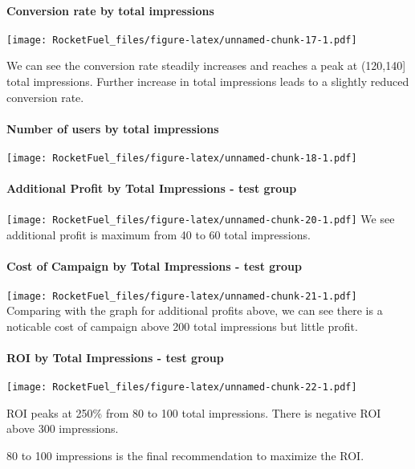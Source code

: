 \documentclass[
]{article}
\begin{document}
\hypertarget{conversion-rate-by-total-impressions-3}{%
\paragraph{Conversion rate by total
impressions}\label{conversion-rate-by-total-impressions-3}}

\texttt{[image: RocketFuel\_files/figure-latex/unnamed-chunk-17-1.pdf]}

We can see the conversion rate steadily increases and reaches a peak at
(120,140{]} total impressions. Further increase in total impressions
leads to a slightly reduced conversion rate.

\hypertarget{number-of-users-by-total-impressions-2}{%
\paragraph{Number of users by total
impressions}\label{number-of-users-by-total-impressions-2}}

\texttt{[image: RocketFuel\_files/figure-latex/unnamed-chunk-18-1.pdf]}

\hypertarget{additional-profit-by-total-impressions---test-group-1}{%
\paragraph{Additional Profit by Total Impressions - test
group}\label{additional-profit-by-total-impressions---test-group-1}}

\texttt{[image: RocketFuel\_files/figure-latex/unnamed-chunk-20-1.pdf]}
We see additional profit is maximum from 40 to 60 total impressions.

\hypertarget{cost-of-campaign-by-total-impressions---test-group-1}{%
\paragraph{Cost of Campaign by Total Impressions - test
group}\label{cost-of-campaign-by-total-impressions---test-group-1}}

\texttt{[image: RocketFuel\_files/figure-latex/unnamed-chunk-21-1.pdf]}
Comparing with the graph for additional profits above, we can see there
is a noticable cost of campaign above 200 total impressions but little
profit.

\hypertarget{roi-by-total-impressions---test-group-1}{%
\paragraph{ROI by Total Impressions - test
group}\label{roi-by-total-impressions---test-group-1}}

\texttt{[image: RocketFuel\_files/figure-latex/unnamed-chunk-22-1.pdf]}

ROI peaks at 250\% from 80 to 100 total impressions. There is negative
ROI above 300 impressions.

80 to 100 impressions is the final recommendation to maximize the ROI.
\end{document}
